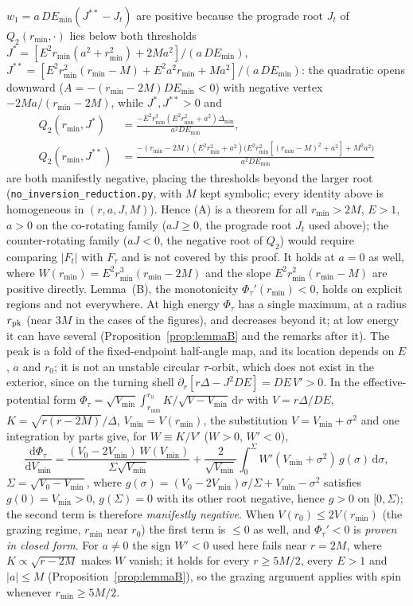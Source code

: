 \documentclass[12pt]{iopart}
\theoremstyle{plain}
\theoremstyle{definition}
\theoremstyle{remark}
\newcommand{\dd}{\mathrm{d}}
\begin{document}
$w_1=a\,DE_{\min}(J^{\ast\ast}-J_t)$ are positive because the prograde root $J_t$ of
$Q_2(r_{\min},\cdot)$ lies below both thresholds
$J^\ast=[E^2r_{\min}(a^2+r_{\min}^2)+2Ma^2]/(a\,DE_{\min})$,
$J^{\ast\ast}=[E^2r_{\min}^2(r_{\min}-M)+E^2a^2r_{\min}+Ma^2]/(a\,DE_{\min})$: the
quadratic opens downward ($A=-(r_{\min}-2M)DE_{\min}<0$) with negative vertex
$-2Ma/(r_{\min}-2M)$, while $J^\ast,J^{\ast\ast}>0$ and
\[
\begin{aligned}
Q_2(r_{\min},J^\ast)&=\frac{-E^2r_{\min}^3(E^2r_{\min}^2+a^2)\Delta_{\min}}{a^2DE_{\min}},\\[2pt]
Q_2(r_{\min},J^{\ast\ast})&=\frac{-(r_{\min}-2M)(E^2r_{\min}^2+a^2)\big(E^2r_{\min}^2[(r_{\min}-M)^2+a^2]+M^2a^2\big)}{a^2DE_{\min}}
\end{aligned}
\]
are both manifestly negative, placing the thresholds beyond the larger root
(\texttt{no\_inversion\_reduction.py}, with $M$ kept symbolic; every identity above is
homogeneous in $(r,a,J,M)$). Hence (A) is a theorem for all $r_{\min}>2M$,
$E>1$, $a>0$ on the co-rotating family ($aJ\ge0$, the prograde root $J_t$ used above); the
counter-rotating family ($aJ<0$, the negative root of $Q_2$) would require comparing
$|F_t|$ with $F_\tau$ and is not covered by this proof. It holds at $a=0$ as well, where $W(r_{\min})=E^2r_{\min}^3(r_{\min}-2M)$ and
the slope $E^2r_{\min}^2(r_{\min}-M)$ are positive directly. Lemma~(B), the monotonicity $\Phi_\tau'(r_{\min})<0$, holds on explicit
regions and not everywhere. At high energy $\Phi_\tau$ has a single maximum, at a radius
$r_{\rm pk}$ (near $3M$ in the cases of the figures), and decreases beyond it; at low
energy it can have several (Proposition~\ref{prop:lemmaB} and the remarks after it). The
peak is a fold of the fixed-endpoint half-angle map, and its location depends on $E$, $a$
and $r_0$; it is not an unstable circular $\tau$-orbit, which does not exist in the
exterior, since on the turning shell $\partial_r[r\Delta-J^2DE]=DE\,V'>0$. In the effective-potential form
$\Phi_\tau=\sqrt{V_{\min}}\int_{r_{\min}}^{r_0}K/\sqrt{V-V_{\min}}\,\dd r$ with
$V=r\Delta/DE$, $K=\sqrt{r(r-2M)}/\Delta$, $V_{\min}=V(r_{\min})$, the substitution
$V=V_{\min}+\sigma^2$ and one integration by parts give, for $W\equiv K/V'$
($W>0$, $W'<0$),
\begin{equation}
    \frac{\dd\Phi_\tau}{\dd V_{\min}}=
    \frac{(V_0-2V_{\min})\,W(V_{\min})}{\Sigma\sqrt{V_{\min}}}
    +\frac{2}{\sqrt{V_{\min}}}\!\int_0^{\Sigma}\!W'(V_{\min}+\sigma^2)\,g(\sigma)\,\dd\sigma,
\end{equation}
$\Sigma=\sqrt{V_0-V_{\min}}$, where $g(\sigma)=(V_0-2V_{\min})\sigma/\Sigma+V_{\min}-\sigma^2$
satisfies $g(0)=V_{\min}>0$, $g(\Sigma)=0$ with its other root negative, hence
$g>0$ on $[0,\Sigma)$; the second term is therefore \emph{manifestly negative}.
When $V(r_0)\le2V(r_{\min})$ (the grazing regime, $r_{\min}$ near $r_0$) the first
term is $\le0$ as well, and $\Phi_\tau'<0$ is \emph{proven in closed form}. For $a\neq0$ the sign $W'<0$ used here fails near $r=2M$, where $K\propto\sqrt{r-2M}$ makes $W$ vanish; it holds for every $r\ge5M/2$, every $E>1$ and $|a|\le M$ (Proposition~\ref{prop:lemmaB}), so the grazing argument applies with spin whenever $r_{\min}\ge5M/2$.
\end{document}
